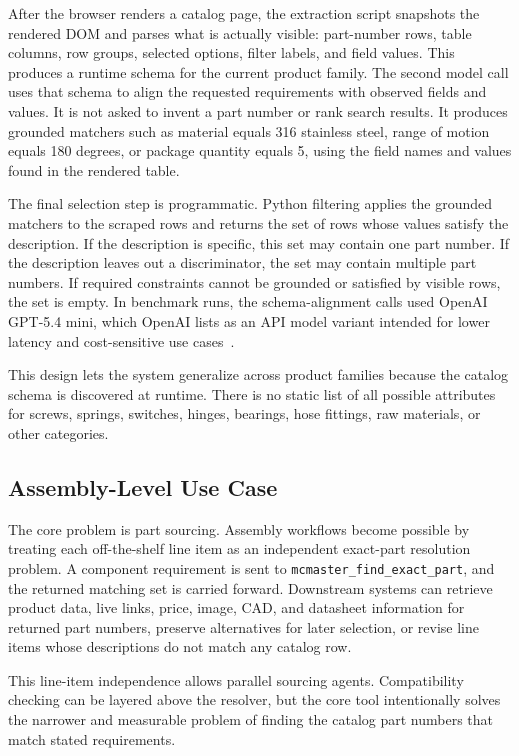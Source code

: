 \documentclass[colorlinks,upint,subscriptcorrection,varvw,hyphenate,balance,nofoot]{asmeconf}
\newcommand{\tool}[1]{\texttt{#1}}
\begin{document}
After the browser renders a catalog page, the extraction script snapshots the rendered DOM and parses what is actually visible: part-number rows, table columns, row groups, selected options, filter labels, and field values. This produces a runtime schema for the current product family. The second model call uses that schema to align the requested requirements with observed fields and values. It is not asked to invent a part number or rank search results. It produces grounded matchers such as material equals 316 stainless steel, range of motion equals 180 degrees, or package quantity equals 5, using the field names and values found in the rendered table.

The final selection step is programmatic. Python filtering applies the grounded matchers to the scraped rows and returns the set of rows whose values satisfy the description. If the description is specific, this set may contain one part number. If the description leaves out a discriminator, the set may contain multiple part numbers. If required constraints cannot be grounded or satisfied by visible rows, the set is empty. In benchmark runs, the schema-alignment calls used OpenAI GPT-5.4 mini, which OpenAI lists as an API model variant intended for lower latency and cost-sensitive use cases~\cite{openaigpt54mini,openaimodels}.

This design lets the system generalize across product families because the catalog schema is discovered at runtime. There is no static list of all possible attributes for screws, springs, switches, hinges, bearings, hose fittings, raw materials, or other categories.

\subsection{Assembly-Level Use Case}

The core problem is part sourcing. Assembly workflows become possible by treating each off-the-shelf line item as an independent exact-part resolution problem. A component requirement is sent to \tool{mcmaster\_find\_exact\_part}, and the returned matching set is carried forward. Downstream systems can retrieve product data, live links, price, image, CAD, and datasheet information for returned part numbers, preserve alternatives for later selection, or revise line items whose descriptions do not match any catalog row.

This line-item independence allows parallel sourcing agents. Compatibility checking can be layered above the resolver, but the core tool intentionally solves the narrower and measurable problem of finding the catalog part numbers that match stated requirements.
\end{document}
